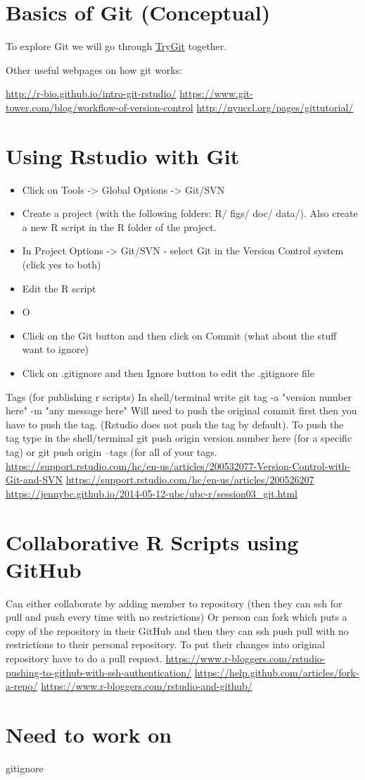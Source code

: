 \documentclass[12pt,letterpaper]{article} %
\begin{document}
\section*{Basics of Git (Conceptual)}
To explore Git we will go through \href{https://try.github.io/levels/1/challenges/1}{TryGit} together.

Other useful webpages on how git works:

\url{http://r-bio.github.io/intro-git-rstudio/}
\url{https://www.git-tower.com/blog/workflow-of-version-control}
\url{http://nyuccl.org/pages/gittutorial/}


\section*{Using Rstudio with Git}
\begin{itemize}
\item Click on Tools -> Global Options -> Git/SVN
\item Create a project (with the following folders: R/ figs/ doc/ data/). Also create a new R script in the R folder of the project.
\item In Project Options -> Git/SVN - select Git in the Version Control system (click yes to both)
\item Edit the R script
\item O
\item Click on the Git button and then click on Commit (what about the stuff want to ignore)
\item Click on .gitignore and then Ignore button to edit the .gitignore file
\end{itemize}

Tags (for publishing r scripts)
In shell/terminal write git tag -a "version number here" -m "any message here"
Will need to push the original commit first then you have to push the tag. (Rstudio does not push the tag by default). To push the tag type in the shell/terminal git push origin version number here (for a specific tag) or git push origin --tags (for all of your tags.
\url{https://support.rstudio.com/hc/en-us/articles/200532077-Version-Control-with-Git-and-SVN}
\url{https://support.rstudio.com/hc/en-us/articles/200526207}
\url{https://jennybc.github.io/2014-05-12-ubc/ubc-r/session03_git.html}


\section*{Collaborative R Scripts using GitHub}
Can either collaborate by adding member to repository (then they can ssh for pull and push every time with no restrictions)
Or person can fork which puts a copy of the repository in their GitHub and then they can ssh push pull with no restrictions to their personal repository. To put their changes into original repository have to do a pull request.
\url{https://www.r-bloggers.com/rstudio-pushing-to-github-with-ssh-authentication/}
\url{https://help.github.com/articles/fork-a-repo/}
\url{https://www.r-bloggers.com/rstudio-and-github/}
\section*{Need to work on}
gitignore
\end{document}
